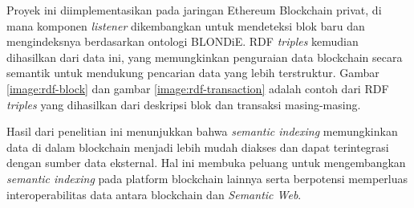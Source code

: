 Proyek ini diimplementasikan pada jaringan Ethereum Blockchain privat, di mana komponen \textit{listener} dikembangkan untuk mendeteksi blok baru dan mengindeksnya berdasarkan ontologi BLONDiE. RDF \textit{triples} kemudian dihasilkan dari data ini, yang memungkinkan penguraian data blockchain secara semantik untuk mendukung pencarian data yang lebih terstruktur. Gambar \ref{image:rdf-block} dan gambar \ref{image:rdf-transaction} adalah contoh dari RDF \textit{triples} yang dihasilkan dari deskripsi blok dan transaksi masing-masing.

Hasil dari penelitian ini menunjukkan bahwa \textit{semantic indexing} memungkinkan data di dalam blockchain menjadi lebih mudah diakses dan dapat terintegrasi dengan sumber data eksternal. Hal ini membuka peluang untuk mengembangkan \textit{semantic indexing} pada platform blockchain lainnya serta berpotensi memperluas interoperabilitas data antara blockchain dan \textit{Semantic Web}.
